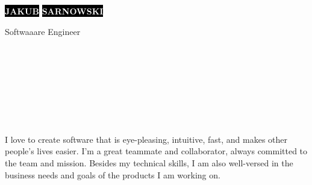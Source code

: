 \documentclass[9pt]{config}
\begin{document}

\begin{minipage}[t]{0.45\textwidth}
  \vspace{-\baselineskip}

  \colorbox{black}{{\HUGE\textcolor{white}{\textbf{\MakeUppercase{Jakub}}}}}
  \colorbox{black}{{\HUGE\textcolor{white}{\textbf{\MakeUppercase{Sarnowski}}}}}

  \vspace{6pt}

  {\huge Softwaaare Engineer}
\end{minipage}
\hfill
\begin{minipage}[t]{0.27\textwidth}
  \vspace{-\baselineskip}

  \\
  \\
  \\
\end{minipage}
\hfill
\begin{minipage}[t]{0.27\textwidth}
  \vspace{-\baselineskip}

  \\
  \\
  \\
\end{minipage}



\begin{minipage}[t]{1\textwidth}
  \vspace{-\baselineskip}

  I love to create software that is eye-pleasing, intuitive, fast,
  and makes other people's lives easier. I’m a great teammate and
  collaborator, always committed to the team and mission. Besides my
  technical skills, I am also well-versed in the business needs and
  goals of the products I am working on.
\end{minipage}
\hfill
\end{document}
